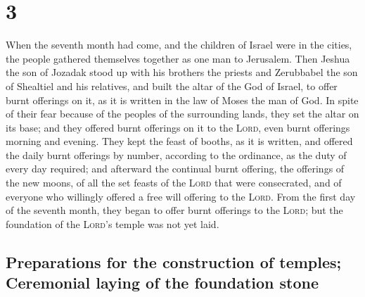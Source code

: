 \hypertarget{section-2}{%
\section{3}\label{section-2}}

 When the seventh month had come, and the children of
Israel were in the cities, the people gathered themselves together as
one man to Jerusalem.  Then Jeshua the son of Jozadak
stood up with his brothers the priests and Zerubbabel the son of
Shealtiel and his relatives, and built the altar of the God of Israel,
to offer burnt offerings on it, as it is written in the law of Moses the
man of God.  In spite of their fear because of the peoples
of the surrounding lands, they set the altar on its base; and they
offered burnt offerings on it to the \textsc{Lord}, even burnt offerings
morning and evening.  They kept the feast of booths, as it
is written, and offered the daily burnt offerings by number, according
to the ordinance, as the duty of every day required;  and
afterward the continual burnt offering, the offerings of the new moons,
of all the set feasts of the \textsc{Lord} that were consecrated, and of
everyone who willingly offered a free will offering to the
\textsc{Lord}.  From the first day of the seventh month,
they began to offer burnt offerings to the \textsc{Lord}; but the
foundation of the \textsc{Lord}'s temple was not yet laid.

\hypertarget{preparations-for-the-construction-of-temples-ceremonial-laying-of-the-foundation-stone}{%
\subsection{Preparations for the construction of temples; Ceremonial
laying of the foundation
stone}\label{preparations-for-the-construction-of-temples-ceremonial-laying-of-the-foundation-stone}}

